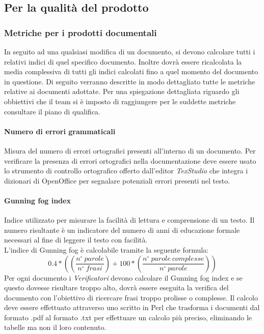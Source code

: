 \subsection{Per la qualità del prodotto}
\subsubsection{Metriche per i prodotti documentali}
In seguito ad una qualsiasi modifica di un documento, si devono calcolare tutti i relativi indici di quel specifico documento. Inoltre dovrà essere ricalcolata la media complessiva di tutti gli indici calcolati fino a quel momento del documento in questione.
Di seguito verranno descritte in modo dettagliato tutte le metriche relative ai documenti adottate. Per una spiegazione dettagliata riguardo gli obbiettivi che il team si è imposto di raggiungere per le suddette metriche consultare il piano di qualifica.

\paragraph{Numero di errori grammaticali}\Spazio
Misura del numero di errori ortografici presenti all'interno di un documento.
Per verificare la presenza di errori ortografici nella documentazione deve essere usato lo strumento di controllo ortografico offerto dall'editor \emph{TexStudio} che integra i dizionari di OpenOffice per segnalare potenziali errori presenti nel testo.

\paragraph{Gunning fog index}\Spazio
Indice utilizzato per misurare la facilità di lettura e comprensione di un testo. Il numero risultante è un indicatore del numero di anni di educazione formale necessari al fine di leggere il testo con facilità. \\
L'indice di Gunning fog è calcolabile tramite la seguente formula:
$$
0.4*((\frac{n^{\circ}\:parole}{n^{\circ}\:frasi})+100*(\frac{n^{\circ}\:parole\:complesse}{n^{\circ}\:parole}))
$$
Per ogni documento i \emph{Verificatori} devono calcolare il Gunning fog index e se questo dovesse risultare troppo alto, dovrà essere eseguita la verifica del documento con l'obiettivo di ricercare frasi troppo prolisse o complesse. Il calcolo deve essere effettuato attraverso uno  scritto in Perl che trasforma i documenti dal formato .pdf al formato .txt per effettuare un calcolo più preciso, eliminando le tabelle ma non il loro contenuto.

